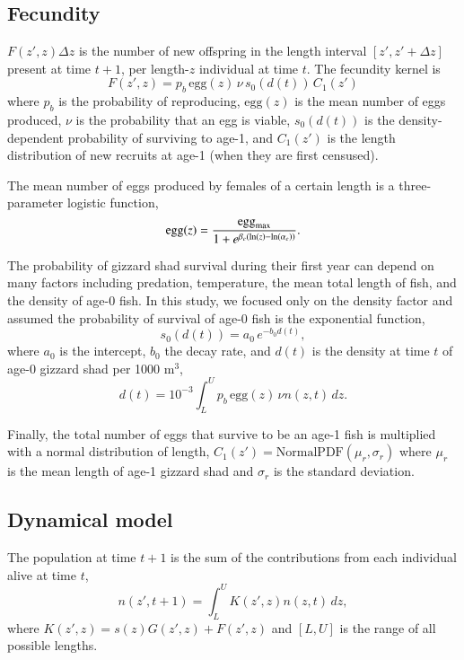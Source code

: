 \documentclass[preprint,review,12pt,authoryear]{elsarticle}
\def\ds{\displaystyle}
\begin{document}
\subsection{Fecundity}

$F(z',z)\Delta z$ is the number of new offspring in the length interval $[z', z' + \Delta z]$ present at time $t+1$, per length-$z$ individual at time $t$.
The fecundity kernel is
\begin{equation}\label{eq:fecundity}
F(z', z) = p_b \, \mbox{egg}(z) \, \nu \, s_0(d(t)) \, C_1(z')
\end{equation}
where $p_b$ is the probability of reproducing, $\mbox{egg}(z)$ is the mean number of eggs produced, $\nu$ is the probability that an egg is viable, $s_0(d(t))$ is the density-dependent probability of surviving to age-1, and $C_1 (z')$ is the length distribution of new recruits at age-1 (when they are first censused).

The mean number of eggs produced by females of a certain length is a three-parameter logistic function,
\begin{equation}\label{eq:egg}
\mbox{egg}(z) = \frac{\mbox{egg}_{\rm max}}{1+e^{\beta_e(\ln(z)-\ln(\alpha_e))}}.
\end{equation}

The probability of gizzard shad survival during their first year can depend on many factors \citep{michaletz2010overwinter} including predation, temperature, the mean total length of fish, and the density of age-0 fish.  
In this study, we focused only on the density factor and assumed the probability of survival of age-0 fish is the exponential function,
\begin{equation}\label{eq:s0}
s_0(d(t)) = a_0 \, e^{-b_0 d(t)},
\end{equation}
where $a_0$ is the intercept, $b_0$ the decay rate, and $d(t)$ is the density at time $t$ of age-0 gizzard shad per 1000 m$^3$, 
\[ d(t) = 10^{-3} \int_L^U p_b \, \mbox{egg}(z) \, \nu n(z,t) \, dz. \]  

Finally, the total number of eggs that survive to be an age-1 fish is multiplied with a normal distribution of length,
$ \ds C_1 (z') =  \mathrm{Normal PDF} (\mu_r, \sigma_r)$ where $\mu_r$ is the mean length of age-1 gizzard shad and $\sigma_r$ is the standard deviation. 

\subsection{Dynamical model} 
The population at time $t+1$ is the sum of the contributions from each individual alive at time $t$,
\begin{equation}\label{eq:IPM}
n(z',t+1) = \int_L^U K(z',z)n(z,t) \,dz,
\end{equation}  
where $K(z',z) = s(z) G(z',z) + F(z',z)$ and $[L,U]$ is the range of all possible lengths.
\end{document}
